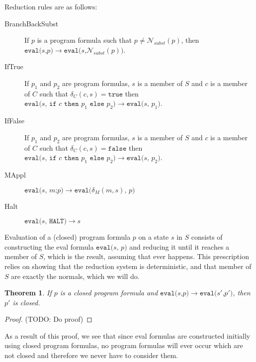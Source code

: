 \documentclass[11pt]{article}
\begin{document}
Reduction rules are as follows:

\begin{description}
\item[BranchBackSubst] If $p$ is a program formula such that $p \neq \mathcal{N}_{subst}(p)$, then $\texttt{eval(}s\texttt{,} p\texttt{)} \longrightarrow \texttt{eval(}s\texttt{,} \mathcal{N}_{subst}(p)\texttt{)}$.
\item[IfTrue] If $p_{1}$ and $p_{2}$ are program formulas, $s$ is a member of $S$ and $c$ is a member of $C$ such that $\delta_{C}(c, s) = \texttt{true}$ then \\ $\texttt{eval(} s \texttt{, } \texttt{if } c \texttt{ then } p_{1} \texttt{ else } p_{2} \texttt{)} \longrightarrow \texttt{eval(} s \texttt{, } p_{1} \texttt{)}$.
\item[IfFalse] If $p_{1}$ and $p_{2}$ are program formulas, $s$ is a member of $S$ and $c$ is a member of $C$ such that $\delta_{C}(c, s) = \texttt{false}$ then \\ $\texttt{eval(} s \texttt{, } \texttt{if } c \texttt{ then } p_{1} \texttt{ else } p_{2} \texttt{)} \longrightarrow \texttt{eval(} s \texttt{, } p_{2} \texttt{)}$.
\item[MAppl] $\texttt{eval(}s\texttt{, } m\texttt{;}p \texttt{)} \longrightarrow \texttt{eval(} \delta_{M}(m, s)\texttt{, } p \texttt{)}$
\item[Halt] $\texttt{eval(}s\texttt{, } \texttt{HALT)} \longrightarrow s$
\end{description}

Evaluation of a (closed) program formula $p$ on a state $s$ in $S$ consists of constructing the eval formula $\texttt{eval(}s\texttt{, } p \texttt{)}$ and reducing it until it reaches a member of $S$, which is the result, assuming that ever happens.  This prescription relies on showing that the reduction system is deterministic, and that member of $S$ are exactly the normals, which we will do.

\newtheorem*{closednessineval}{Theorem}
\begin{closednessineval}
If $p$ is a closed program formula and $\texttt{eval(}s\texttt{,} p\texttt{)} \longrightarrow \texttt{eval(}s'\texttt{,} p'\texttt{)}$, then $p'$ is closed.
\end{closednessineval}

\begin{proof}
(TODO: Do proof)
\end{proof}

As a result of this proof, we see that since eval formulas are constructed initially using closed program formulas, no program formulas will ever occur which are not closed and therefore we never have to consider them.
\end{document}
